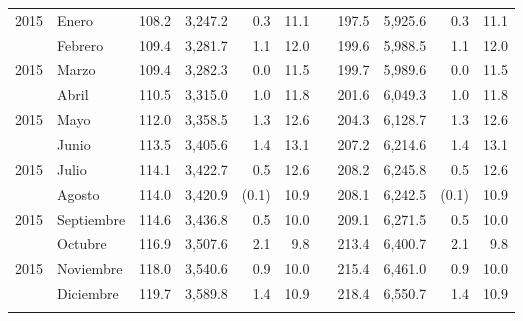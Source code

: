 \begin{center}
\begin{longtable}{llrrrrrrrrr}
		\multicolumn{1}{l}{	2015	}&	Enero	&	 108.2 	&	 3,247.2 	&	 0.3 	&	 11.1 	&  &	 197.5 	&	 5,925.6 	&	 0.3 	&	 11.1 	\\
		\rowcolor{color1!5!white}\multicolumn{1}{l}{	2015	}&	Febrero	&	 109.4 	&	 3,281.7 	&	 1.1 	&	 12.0 	&  &	 199.6 	&	 5,988.5 	&	 1.1 	&	 12.0 	\\
		\multicolumn{1}{l}{	2015	}&	Marzo	&	 109.4 	&	 3,282.3 	&	 0.0 	&	 11.5 	&  &	 199.7 	&	 5,989.6 	&	 0.0 	&	 11.5 	\\
		\rowcolor{color1!5!white}\multicolumn{1}{l}{	2015	}&	Abril	&	 110.5 	&	 3,315.0 	&	 1.0 	&	 11.8 	&  &	 201.6 	&	 6,049.3 	&	 1.0 	&	 11.8 	\\
		\multicolumn{1}{l}{	2015	}&	Mayo	&	 112.0 	&	 3,358.5 	&	 1.3 	&	 12.6 	&  &	 204.3 	&	 6,128.7 	&	 1.3 	&	 12.6 	\\
		\rowcolor{color1!5!white}\multicolumn{1}{l}{	2015	}&	Junio	&	 113.5 	&	 3,405.6 	&	 1.4 	&	 13.1 	&  &	 207.2 	&	 6,214.6 	&	 1.4 	&	 13.1 	\\
		\multicolumn{1}{l}{	2015	}&	Julio	&	 114.1 	&	 3,422.7 	&	 0.5 	&	 12.6 	&  &	 208.2 	&	 6,245.8 	&	 0.5 	&	 12.6 	\\
		\rowcolor{color1!5!white}\multicolumn{1}{l}{	2015	}&	Agosto	&	 114.0 	&	 3,420.9 	&	 (0.1)	&	 10.9 	&  &	 208.1 	&	 6,242.5 	&	 (0.1)	&	 10.9 	\\
		\multicolumn{1}{l}{	2015	}&	Septiembre	&	 114.6 	&	 3,436.8 	&	 0.5 	&	 10.0 	&  &	 209.1 	&	 6,271.5 	&	 0.5 	&	 10.0 	\\
		\rowcolor{color1!5!white}\multicolumn{1}{l}{	2015	}&	Octubre	&	 116.9 	&	 3,507.6 	&	 2.1 	&	 9.8 	&  &	 213.4 	&	 6,400.7 	&	 2.1 	&	 9.8 	\\
		\multicolumn{1}{l}{	2015	}&	Noviembre	&	 118.0 	&	 3,540.6 	&	 0.9 	&	 10.0 	&  &	 215.4 	&	 6,461.0 	&	 0.9 	&	 10.0 	\\
		\rowcolor{color1!5!white}\multicolumn{1}{l}{	2015	}&	Diciembre	&	 119.7 	&	 3,589.8 	&	 1.4 	&	 10.9 	&  &	 218.4 	&	 6,550.7 	&	 1.4 	&	 10.9 	\\
		\hline
		&&&&&&&&&&\\[-0.28cm]
	\end{longtable}
\end{center}

